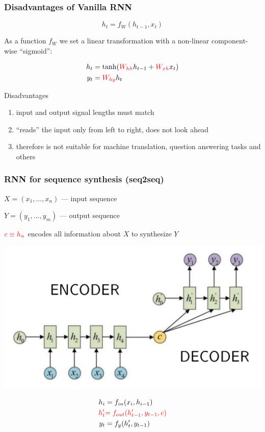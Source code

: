 \documentclass[fullscreen=true, bookmarks=true, hyperref={pdfencoding=unicode}]{beamer}
\begin{document}
\begin{frame}
  \frametitle{Disadvantages of Vanilla RNN}

  $$ h_t = f_W(h_{t-1}, x_t)$$

  As a function $f_W$ we set a linear transformation with a non-linear component-wise ``sigmoid'':

  \begin{align*}
    h_t &= \tanh ({\color{red}W_{hh}} h_{t-1} + {\color{red}W_{xh}} x_t) \\
    y_t &= {\color{red}W_{hy}} h_t
  \end{align*}

  \pause
  Disadvantages
   \begin{enumerate}
     \item input and output signal lengths must match
     \item ``reads'' the input only from left to right, does not look ahead
     \item therefore is not suitable for machine translation, question answering tasks and others
   \end{enumerate}

\end{frame}


\begin{frame}
   \frametitle{RNN for sequence synthesis (seq2seq)}

   $X = (x_1, \dots, x_n)$ — input sequence

   $Y = (y_1, \dots, y_m)$ — output sequence

   ${\color{red}c \equiv h_n}$ encodes all information about $X$ to synthesize $Y$

   \begin{center}
     \includegraphics[keepaspectratio,
                    width=.5\paperwidth]{seq2seq.png}
   \end{center}

  \begin{center}
    \begin{align*}
      h_i &= f_{in}(x_i, h_{i-1}) \\
      {\color{red}h_t^\prime} &{\color{red}= f_{out}(h_{t-1}^\prime,y_{t-1},c)} \\
      y_t &= f_{y}(h_t^\prime, y_{t-1})
    \end{align*}
  \end{center}
\end{frame}
\end{document}
